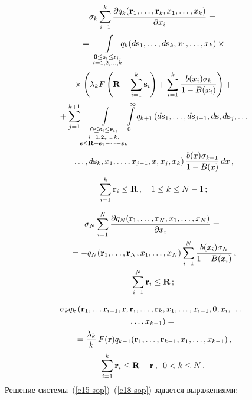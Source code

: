 \begin{multicols}{2}
\vspace*{-12pt}

\noindent
\begin{multline}
  \sigma_k \sum\limits^k_{i=1} \fr{\partial q_k(\mathbf{r}_1, \ldots, 
\mathbf{r}_k, x_1,\ldots, x_k)}{\partial x_i}={}\\[2pt]
  {}= - \hspace*{-2mm}\int\limits_{\substack{{\mathbf{0}\leq 
  \mathbf{s}_i\leq \mathbf{r}_i,}\\  {i=1,2,\ldots,k}}} 
  \hspace*{-2mm}q_k (d\mathbf{s}_1,\ldots, d\mathbf{s}_k, x_1,\ldots, x_k) \times{}\\[2pt]
  {}\times\left( \lambda_k F\left( \mathbf{R}-
\sum\limits^k_{i=1} \mathbf{s}_i\right) +\sum\limits^k_{i=1} \fr{b(x_i)\sigma_k}{1-
B(x_i)}\right)+{}\\[2pt]
  {}+ \sum\limits^{k+1}_{j=1}
  \int\limits_{\substack{{\mathbf{0}\leq \mathbf{s}_i\leq \mathbf{r}_i,}\\[2pt]  
  {i=1,2,\ldots,k,}\\ {\mathbf{s}\leq 
\mathbf{R}-\mathbf{s}_1-\cdots -\mathbf{s}_k}}} \!\!\!\int\limits_0^\infty  q_{k+1}
  \left(d\mathbf{s}_1, \ldots, d\mathbf{s}_{j-1}, d\mathbf{s}, d\mathbf{s}_j,\ldots\right.\\[2pt]
\left.  \ldots, d\mathbf{s}_k, x_1,\ldots, x_{j-1},x,x_j, x_k\right)
  \fr{b(x)\sigma_{k+1}}{1-B(x)}\,dx\,,\\[2pt]
  \sum\limits^k_{i=1}\mathbf{r}_i\leq \mathbf{R}\,,\quad 1\leq k\leq N-1\,;
  \label{e16-sop}
  \end{multline}
  

\noindent
  \begin{multline}
  \sigma_N \sum\limits^N_{i=1} \displaystyle\frac{\displaystyle \partial q_N(\mathbf{r}_1,\ldots, 
\mathbf{r}_N, x_1,\ldots, x_N)\mathstrut}{\displaystyle \partial x_i\mathstrut}={}\\
  {}= -q_N(\mathbf{r}_1,\ldots, \mathbf{r}_N, x_1,\ldots, x_N) 
\sum\limits^N_{i=1} \displaystyle\frac{\displaystyle b(x_i) \sigma_N\mathstrut}{\displaystyle 1-B(x_i)\mathstrut}\,,\\ 
\sum\limits^N_{i=1} \mathbf{r}_i\leq \mathbf{R}\,;
  \label{e17-sop}
  \end{multline}
  
\vspace*{-12pt}

\noindent
  \begin{multline}
  \!\!\!\sigma_k q_k\left( \mathbf{r}_1,\ldots \mathbf{r}_{i-1}, \mathbf{r}, 
\mathbf{r}_i, \ldots, \mathbf{r}_k, x_1,\ldots, x_{i-1},0, x_i, \ldots\right.\\
\left.\ldots, 
x_{k-1}\right)={}\\
  {}=\displaystyle\frac{\displaystyle \lambda_k\mathstrut}{\displaystyle k\mathstrut}\,F(\mathbf{r}) q_{k-1}(\mathbf{r}_1, \ldots, 
\mathbf{r}_{k-1}, x_1,\ldots, x_{k-1})\,,\\
  \sum\limits^k_{i=1} \mathbf{r}_i \leq \mathbf{R} -\mathbf{r}\,,\enskip 
0<k\leq N\,.
  \label{e18-sop}
  \end{multline}
    Решение системы~(\ref{e15-sop})--(\ref{e18-sop}) задается выражениями:
    

\end{multicols}
